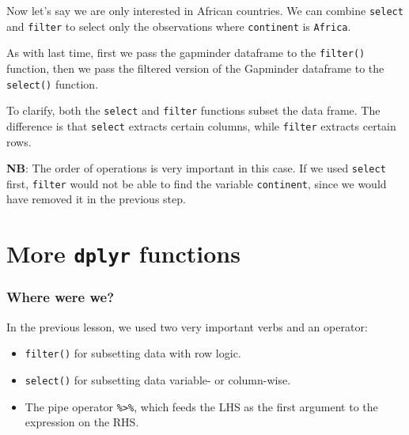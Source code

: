\documentclass[
]{book}
\newenvironment{Shaded}{\begin{snugshade}}{\end{snugshade}}
\newcommand{\KeywordTok}[1]{\textcolor[rgb]{0.13,0.29,0.53}{\textbf{#1}}}
\newcommand{\NormalTok}[1]{#1}
\newcommand{\OperatorTok}[1]{\textcolor[rgb]{0.81,0.36,0.00}{\textbf{#1}}}
\newcommand{\StringTok}[1]{\textcolor[rgb]{0.31,0.60,0.02}{#1}}
\providecommand{\tightlist}{%
  \setlength{\itemsep}{0pt}\setlength{\parskip}{0pt}}
\begin{document}
Now let's say we are only interested in African countries. We can combine \texttt{select} and \texttt{filter} to select only the observations where \texttt{continent} is \texttt{Africa}.

\begin{Shaded}
\end{Shaded}

As with last time, first we pass the gapminder dataframe to the \texttt{filter()} function, then we pass the filtered version of the Gapminder dataframe to the \texttt{select()} function.

To clarify, both the \texttt{select} and \texttt{filter} functions subset the data frame. The difference is that \texttt{select} extracts certain columns, while \texttt{filter} extracts certain rows.

\textbf{NB}: The order of operations is very important in this case. If we used \texttt{select} first, \texttt{filter} would not be able to find the variable \texttt{continent}, since we would have removed it in the previous step.

\hypertarget{more-dplyr-functions}{%
\section{\texorpdfstring{More \texttt{dplyr} functions}{More dplyr functions}}\label{more-dplyr-functions}}

\hypertarget{where-were-we}{%
\subsubsection*{Where were we?}\label{where-were-we}}

In the previous lesson, we used two very important verbs and an operator:

\begin{itemize}
\tightlist
\item
  \texttt{filter()} for subsetting data with row logic.
\item
  \texttt{select()} for subsetting data variable- or column-wise.
\item
  The pipe operator \texttt{\%\textgreater{}\%}, which feeds the LHS as the first argument to the expression on the RHS.
\end{itemize}
\end{document}
